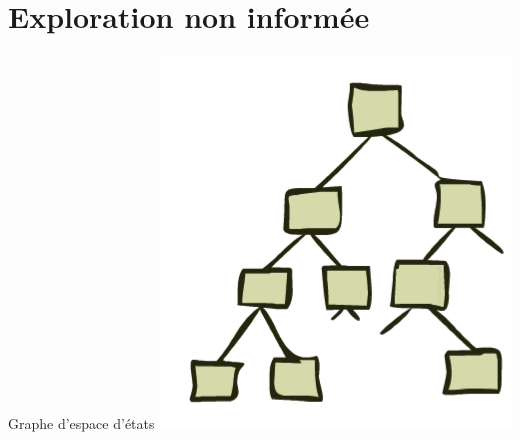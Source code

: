 \documentclass{beamer}
\begin{document}
\section{Exploration non informée}%
\label{sec:exploration_non_informee}
\begin{frame}[t]{Graphe d'espace d'états}
 \centering 
 \includegraphics[width=0.7\textwidth,
 height=0.5\textheight]{./images/state_graph.png}
\end{frame}
\end{document}
